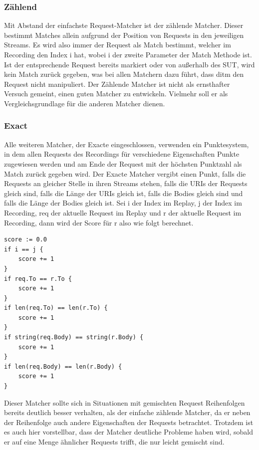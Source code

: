\documentclass[12pt,a4paper]{report}
\begin{document}
\subsubsection{Zählend}
Mit Abstand der einfachste Request-Matcher ist der zählende Matcher. Dieser bestimmt Matches allein aufgrund der Position
von Requests in den jeweiligen Streams. Es wird also immer der Request als Match bestimmt, welcher im Recording den Index i hat,
wobei i der zweite Parameter der Match Methode ist. Ist der entsprechende Request bereits markiert oder von außerhalb des SUT,
wird kein Match zurück gegeben, was bei allen Matchern dazu führt, dass ditm den Request nicht manipuliert.
Der Zählende Matcher ist nicht als ernsthafter Versuch gemeint, einen guten Matcher zu entwickeln. Vielmehr soll
er als Vergleichsgrundlage für die anderen Matcher dienen.

\subsubsection{Exact}
Alle weiteren Matcher, der Exacte eingeschlossen, verwenden ein Punktesystem, in dem allen Requests des Recordings für verschiedene
Eigenschaften Punkte zugewiesen werden und am Ende der Request mit der höchsten Punktzahl als Match zurück gegeben wird.
Der Exacte Matcher vergibt einen Punkt, falls die Requests an gleicher Stelle in ihren Streams stehen, falls die URIs der
Requests gleich sind, falls die Länge der URIs gleich ist, falls die Bodies gleich sind und falls die Länge der Bodies gleich ist.
Sei i der Index im Replay, j der Index im Recording, req der aktuelle Request im Replay und r der aktuelle
Request im Recording, dann wird der Score für r also wie folgt berechnet.
\begin{lstlisting}
score := 0.0
if i == j {
    score += 1
}
if req.To == r.To {
    score += 1
}
if len(req.To) == len(r.To) {
    score += 1
}
if string(req.Body) == string(r.Body) {
    score += 1
}
if len(req.Body) == len(r.Body) {
    score += 1
}
\end{lstlisting}
Dieser Matcher sollte sich in Situationen mit gemischten Request Reihenfolgen bereits deutlich besser verhalten, als der
einfache zählende Matcher, da er neben der Reihenfolge auch andere Eigenschaften der Requests betrachtet. Trotzdem ist es auch
hier vorstellbar, dass der Matcher deutliche Probleme haben wird, sobald er auf eine Menge ähnlicher Requests trifft, die nur
leicht gemischt sind.
\end{document}
